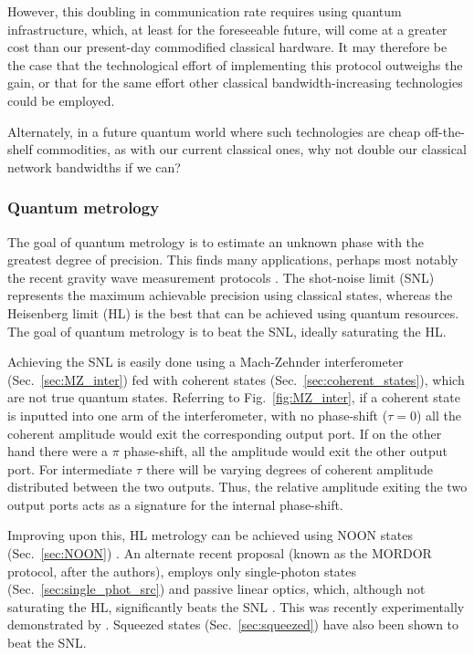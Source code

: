 \documentclass[aps, rmp, twocolumn, amsmath, amssymb, nofootinbib, superscriptaddress, longbibliography, floatfix, table-of-contents, eqsecnum]{revtex4-1}
\begin{document}
However, this doubling in communication rate requires using quantum infrastructure, which, at least for the foreseeable future, will come at a greater cost than our present-day commodified classical hardware. It may therefore be the case that the technological effort of implementing this protocol outweighs the gain, or that for the same effort other classical bandwidth-increasing technologies could be employed.

Alternately, in a future quantum world where such technologies are cheap off-the-shelf commodities, as with our current classical ones, why not double our classical network bandwidths if we can?

%
%

\subsubsection{Quantum metrology} \label{sec:metrology} 

The goal of quantum metrology is to estimate an unknown phase with the greatest degree of precision. This finds many applications, perhaps most notably the recent gravity wave measurement protocols \cite{???}. The shot-noise limit (SNL) represents the maximum achievable precision using classical states, whereas the Heisenberg limit (HL) is the best that can be achieved using quantum resources. The goal of quantum metrology is to beat the SNL, ideally saturating the HL.

Achieving the SNL is easily done using a Mach-Zehnder interferometer (Sec.~\ref{sec:MZ_inter}) fed with coherent states (Sec.~\ref{sec:coherent_states}), which are not true quantum states. Referring to Fig.~\ref{fig:MZ_inter}, if a coherent state is inputted into one arm of the interferometer, with no phase-shift (\mbox{$\tau=0$}) all the coherent amplitude would exit the corresponding output port. If on the other hand there were a $\pi$ phase-shift, all the amplitude would exit the other output port. For intermediate $\tau$ there will be varying degrees of coherent amplitude distributed between the two outputs. Thus, the relative amplitude exiting the two output ports acts as a signature for the internal phase-shift.

Improving upon this, HL metrology can be achieved using NOON states (Sec.~\ref{sec:NOON}) \cite{bib:Dowling08}. An alternate recent proposal (known as the MORDOR protocol, after the authors), employs only single-photon states (Sec.~\ref{sec:single_phot_src}) and passive linear optics, which, although not saturating the HL, significantly beats the SNL \cite{bib:MORDOR15, bib:MORDOR2}. This was recently experimentally demonstrated by \cite{???}. Squeezed states (Sec.~\ref{sec:squeezed}) have also been shown to beat the SNL.
\end{document}
